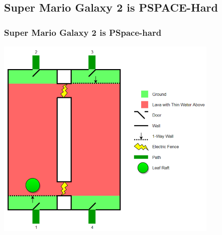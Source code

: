 \documentclass{beamer}
\begin{document}
\subsection{Super Mario Galaxy 2 is PSPACE-Hard}
\begin{frame}
  \frametitle{Super Mario Galaxy 2 is PSpace-hard}
  \includegraphics[width=0.8\textwidth]{res/Super Mario Galaxy 2.png}
\end{frame}
\end{document}
